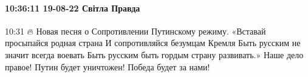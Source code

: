  
 
 
 
 

\paragraph{10:36:11 19-08-22 Світла Правда}
10:31
🔥 Новая песня о Сопротивлении Путинскому режиму.
«Вставай просыпайся родная страна
И сопротивляйся безумцам Кремля
Быть русским не значит всегда воевать
Быть русским быть гордым страну развивать.»
Наше дело правое!
Путин будет уничтожен!
Победа будет за нами!
